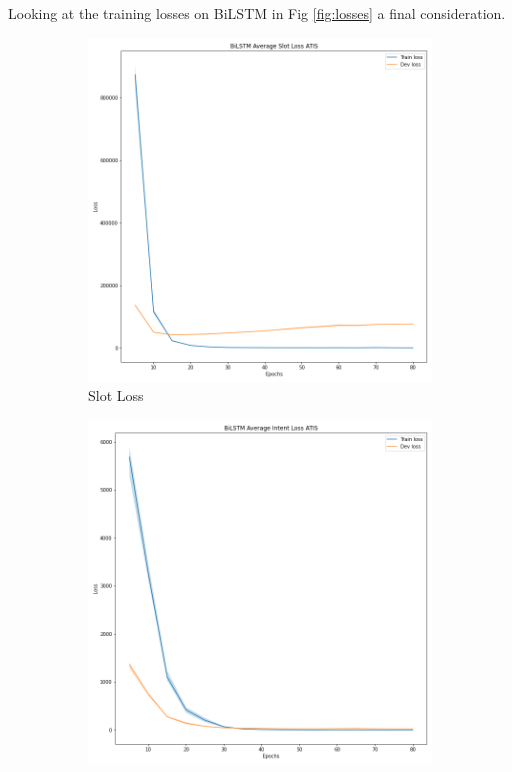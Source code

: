 \documentclass[a4paper]{article}
\begin{document}
Looking at the training losses on BiLSTM in Fig \ref{fig:losses} a final consideration.
\begin{figure}[h!]
	\centering
	\begin{subfigure}[b]{0.22\textwidth}
		\centering
		\includegraphics[width=\textwidth]{"../assets/images/losses/BiLSTM Average Slot Loss ATIS.png"}
				\caption{Slot Loss}
	\end{subfigure}	
	\hfill
	\begin{subfigure}[b]{0.22\textwidth}
		\centering
		\includegraphics[width=\textwidth]{"../assets/images/losses/BiLSTM Average Intent Loss ATIS.png"}

\end{subfigure}
\end{figure}
\end{document}
